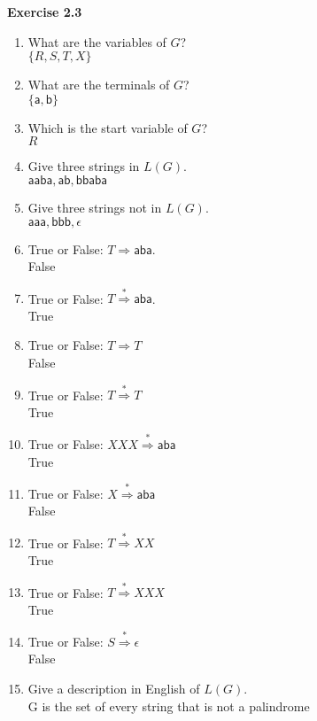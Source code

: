 \documentclass{article}
\makeatletter
\newcommand\exercise[1]{\par\vspace{4ex}\normalfont\normalsize\noindent
\textbf{\large Exercise #1}\par\nobreak\@afterindentfalse\@afterheading}
\makeatother
\begin{document}
\exercise{2.3}
\begin{multicols}{2}
	\begin{enumerate}
	\item What are the variables of $G$? \\ $\{R,S,T,X\}$
	\item What are the terminals of $G$? \\ $\{\textsf{a},\textsf{b}\}$
	\item Which is the start variable of $G$? \\ $R$
	\item Give three strings in $L(G)$. \\  $\textsf{aaba}, \textsf{ab}, \textsf{bbaba}$
	\item Give three strings not in $L(G)$. \\ $\textsf{aaa}, \textsf{bbb}, \epsilon$
	\item True or False: $T \Rightarrow \textsf{aba}$. \\ False
	\item True or False: $T \stackrel*\Rightarrow \textsf{aba}$. \\ True
	\item True or False: $T \Rightarrow T$ \\ False
	\item True or False: $T \stackrel*\Rightarrow T$ \\ True
	\item True or False: $X X X \stackrel*\Rightarrow \textsf{aba}$ \\ True
	\item True or False: $X \stackrel*\Rightarrow \textsf{aba}$ \\ False
	\item True or False: $T \stackrel*\Rightarrow X X$ \\ True
	\item True or False: $T \stackrel*\Rightarrow X X X$ \\ True
	\item True or False: $S \stackrel*\Rightarrow \epsilon$ \\ False
	\item Give a description in English of $L(G)$. \\ G is the set of every string that is not a palindrome
	\end{enumerate}
\end{multicols}
\end{document}
